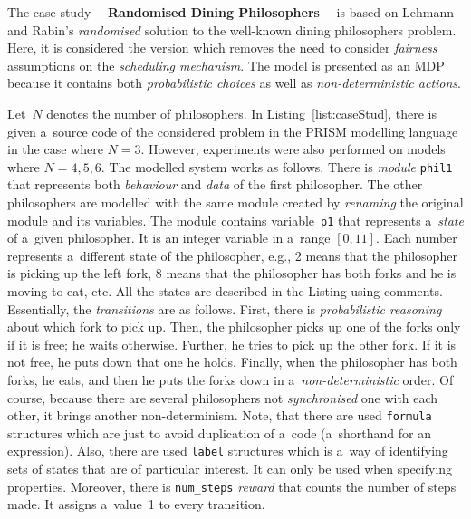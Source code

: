 \documentclass[a4paper, 11pt]{article}
\theoremstyle{definition}
\begin{document}
The case study\,---\,\textbf{Randomised Dining Philosophers}\,---\,is based
on Lehmann and Rabin's \emph{randomised} solution to the well-known
dining philosophers problem. Here, it is considered the version which
removes the need to consider \emph{fairness} assumptions on the
\emph{scheduling mechanism}. The model is presented as an MDP because it
contains both \emph{probabilistic choices} as well as
\emph{non-deterministic actions}.

Let~$ N $ denotes the number of philosophers. In
Listing~\ref{list:caseStud}, there is given a~source code of the
considered problem in the PRISM modelling language in the case where
$ N = 3 $. However, experiments were also performed on models where
$ N = 4, 5, 6 $. The modelled system works as follows. There is
\emph{module} \texttt{phil1} that represents both \emph{behaviour}
and \emph{data} of the first philosopher. The other philosophers
are modelled with the same module created by \emph{renaming} the original
module and its variables. The module contains variable~\texttt{p1}
that represents a~\emph{state} of a~given philosopher. It is an integer
variable in a~range $ [0, 11] $. Each number represents a~different
state of the philosopher, e.g., 2 means that the philosopher is
picking up the left fork, 8 means that the philosopher has both
forks and he is moving to eat, etc. All the states are described
in the Listing using comments. Essentially, the \emph{transitions} are as
follows. First, there is \emph{probabilistic reasoning} about which
fork to pick up. Then, the philosopher picks up one of the forks only if
it is free; he waits otherwise. Further, he tries to pick up the other
fork. If it is not free, he puts down that one he holds. Finally, when
the philosopher has both forks, he eats, and then he puts the forks down
in a~\emph{non-deterministic} order. Of course, because there are several
philosophers not \emph{synchronised} one with each other, it brings
another non-determinism. Note, that there are used \texttt{formula}
structures which are just to avoid duplication of a~code (a~shorthand
for an expression). Also, there are used \texttt{label} structures which
is a~way of identifying sets of states that are of particular interest.
It can only be used when specifying properties. Moreover, there is
\texttt{num\_steps} \emph{reward} that counts the number of steps made. It
assigns a~value~1 to every transition.
\end{document}

